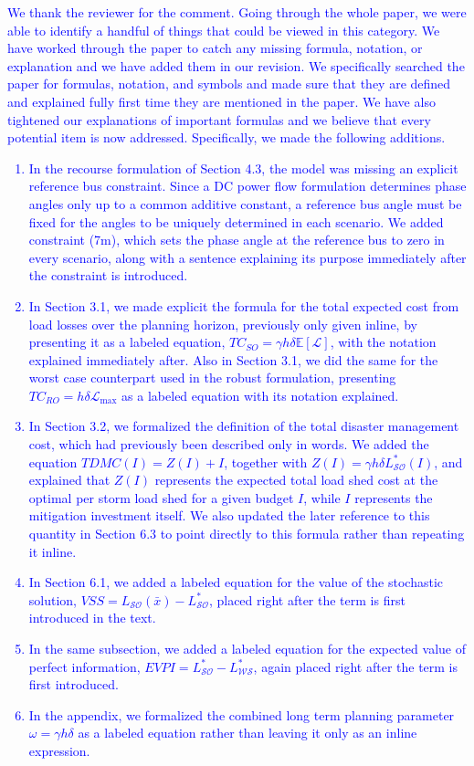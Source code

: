 \documentclass[authoryear,preprint,review,12pt]{elsarticle}\usepackage{amssymb}
\begin{document}
\textcolor{blue}{We thank the reviewer for the comment. Going through the whole paper, we were able to identify a handful of things that could be viewed in this category. We have worked through the paper to catch any missing formula, notation, or explanation and we have added them in our revision. We specifically searched the paper for formulas, notation, and symbols and made sure that they are defined and explained fully first time they are mentioned in the paper. We have also tightened our explanations of important formulas and we believe that every potential item is now addressed. Specifically, we made the following additions.}
\textcolor{blue}{
\begin{enumerate}
    \item \textcolor{blue}{In the recourse formulation of Section 4.3, the model was missing an explicit reference bus constraint. Since a DC power flow formulation determines phase angles only up to a common additive constant, a reference bus angle must be fixed for the angles to be uniquely determined in each scenario. We added constraint (7m), which sets the phase angle at the reference bus to zero in every scenario, along with a sentence explaining its purpose immediately after the constraint is introduced.}
    \item \textcolor{blue}{In Section 3.1, we made explicit the formula for the total expected cost from load losses over the planning horizon, previously only given inline, by presenting it as a labeled equation, $TC_{SO} = \gamma h \delta \mathbb{E}[\mathcal{L}]$, with the notation explained immediately after.}
    \textcolor{blue}{Also in Section 3.1, we did the same for the worst case counterpart used in the robust formulation, presenting $TC_{RO} = h \delta \mathcal{L}_{\max}$ as a labeled equation with its notation explained.}
    \item \textcolor{blue}{In Section 3.2, we formalized the definition of the total disaster management cost, which had previously been described only in words. We added the equation $TDMC(I) = Z(I) + I$, together with $Z(I) = \gamma h \delta L_{\mathcal{SO}}^*(I)$, and explained that $Z(I)$ represents the expected total load shed cost at the optimal per storm load shed for a given budget $I$, while $I$ represents the mitigation investment itself. We also updated the later reference to this quantity in Section 6.3 to point directly to this formula rather than repeating it inline.}
    \item \textcolor{blue}{In Section 6.1, we added a labeled equation for the value of the stochastic solution, $VSS = L_{\mathcal{SO}}(\bar{x}) - L_{\mathcal{SO}}^*$, placed right after the term is first introduced in the text.}
    \item \textcolor{blue}{In the same subsection, we added a labeled equation for the expected value of perfect information, $EVPI = L_{\mathcal{SO}}^* - L_{\mathcal{WS}}^*$, again placed right after the term is first introduced.}
    \item \textcolor{blue}{In the appendix, we formalized the combined long term planning parameter $\omega = \gamma h \delta$ as a labeled equation rather than leaving it only as an inline expression.}
\end{enumerate}
}
\end{document}
